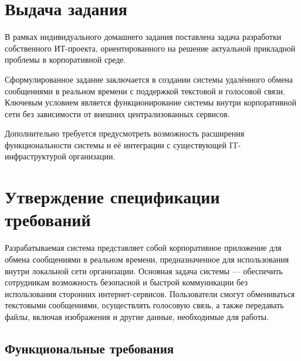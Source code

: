 \documentclass[14pt,a4paper]{extarticle}
\begin{document}
\section{Выдача задания}

В рамках индивидуального домашнего задания поставлена задача разработки
собственного ИТ-проекта, ориентированного на решение актуальной прикладной
проблемы в корпоративной среде.

Сформулированное задание заключается в создании системы удалённого обмена
сообщениями в реальном времени с поддержкой текстовой и голосовой связи.
Ключевым условием является функционирование системы внутри корпоративной сети
без зависимости от внешних централизованных сервисов.

Дополнительно требуется предусмотреть возможность расширения функциональности
системы и её интеграции с существующей IT-инфраструктурой организации.

\section{Утверждение спецификации требований}

Разрабатываемая система представляет собой корпоративное приложение для обмена сообщениями в реальном времени, предназначенное для использования внутри локальной сети организации. Основная задача системы — обеспечить сотрудникам возможность безопасной и быстрой коммуникации без использования сторонних интернет-сервисов. Пользователи смогут обмениваться текстовыми сообщениями, осуществлять голосовую связь, а также передавать файлы, включая изображения и другие данные, необходимые для работы.

\newpage
\subsection*{Функциональные требования}
\end{document}
